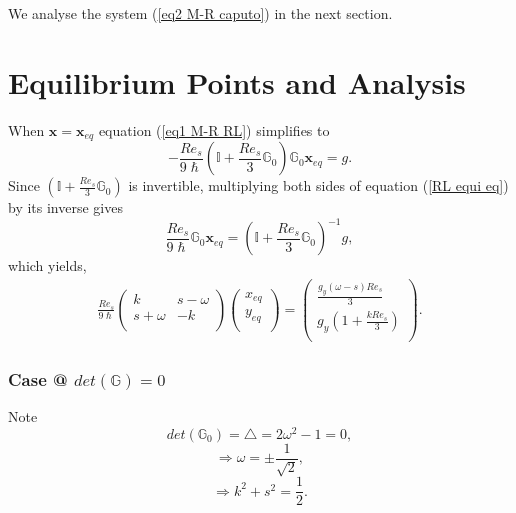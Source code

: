 \documentclass[pdflatex,sn-mathphys]{sn-jnl}%
\makeatletter
\theoremstyle{thmstyleone}%
\theoremstyle{thmstyletwo}%
\theoremstyle{thmstylethree}%
\newcommand*{\rom}[1]{\expandafter\@slowromancap\romannumeral #1@}
\makeatother
\begin{document}
 We analyse the system (\ref{eq2 M-R caputo}) in the next section.


\section{Equilibrium Points and Analysis}\label{Equilibrium-points}

When $\mathbf{x}=\mathbf{x}_{eq}$ equation (\ref{eq1 M-R RL}) simplifies to %
 \begin{equation}
-\frac{Re_{s}}{9 \hslash}\left(\mathbb{I}+\frac{Re_{s}}{3} \mathbb{G}_{0}\right) \mathbb{G}_{0} \mathbf{x}_{eq}=g.\label{RL equi eq}
\end{equation}
Since $ \left(\mathbb{I}+\frac{Re_{s}}{3} \mathbb{G}_{0}\right)$ is invertible, multiplying both sides of equation (\ref{RL equi eq}) by its inverse gives $$\frac{Re_{s}}{9 \hslash}\mathbb{G}_{0} \mathbf{x}_{eq}=\left(\mathbb{I}+\frac{Re_{s}}{3} \mathbb{G}_{0}\right)^{-1}g, $$ 
which yields, 
\begin{equation}
  \begin{aligned}
  \frac{Re_{s}}{9\hslash}\left(
\begin{array}{cc}
 k & s-\omega \\
 s+\omega & -k \\
\end{array}
\right)\left(
\begin{array}{cc}
x_{eq}\\
y_{eq}\\
\end{array}
\right)=
\left(
\begin{array}{cc}
 \frac{g_{y}(\omega-s)Re_{s}}{3}  \\
g_{y} (1+\frac{kRe_{s}}{3} )\\
\end{array}
\right). \label{simplified eq finding system} \end{aligned}
\end{equation}

\subsubsection{Case \rom{1} $det(\mathbb{G})=0$}
        Note $$det(\mathbb{G}_{0})=\triangle=2\omega^2-1=0,$$
$$\Rightarrow \omega=\pm \frac{1}{\sqrt{2}},$$
$$\Rightarrow k^2+s^2= \frac{1}{2}.$$
\end{document}

